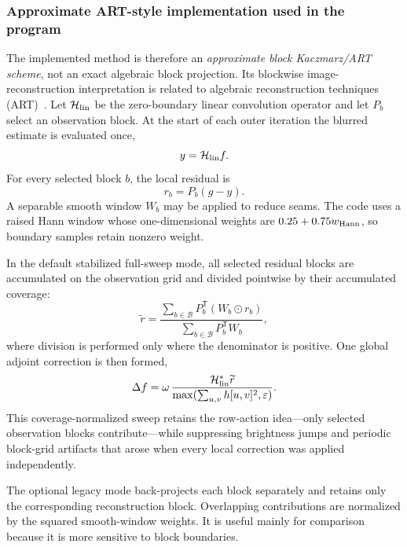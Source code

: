 \documentclass[10pt,a4paper]{article}
\begin{document}
\subsubsection*{Approximate ART-style implementation used in the program}
The implemented method is therefore an \emph{approximate block Kaczmarz/ART scheme}, not an exact algebraic block projection. Its blockwise image-reconstruction interpretation is related to algebraic reconstruction techniques (ART)~\cite{Gordon1970}. Let $\mathcal H_{\rm lin}$ be the zero-boundary linear convolution operator and let $P_b$ select an observation block. At the start of each outer iteration the blurred estimate is evaluated once,
\begin{equation}y=\mathcal H_{\rm lin}f.
\end{equation}
For every selected block $b$, the local residual is
\begin{equation}r_b=P_b(g-y).
\end{equation}
A separable smooth window $W_b$ may be applied to reduce seams. The code uses a raised Hann window whose one-dimensional weights are $0.25+0.75w_{\rm Hann}$, so boundary samples retain nonzero weight.

In the default stabilized full-sweep mode, all selected residual blocks are accumulated on the observation grid and divided pointwise by their accumulated coverage:
\begin{equation}
\widetilde r=
\frac{\sum_{b\in\mathcal B}P_b^{\mathsf T}(W_b\odot r_b)}
{\sum_{b\in\mathcal B}P_b^{\mathsf T}W_b},
\end{equation}
where division is performed only where the denominator is positive. One global adjoint correction is then formed,
\begin{equation}
\Delta f=\omega\,
\frac{\mathcal H_{\rm lin}^{*}\widetilde r}
{\max(\sum_{u,v}h[u,v]^2,\varepsilon)}.
\end{equation}
This coverage-normalized sweep retains the row-action idea---only selected observation blocks contribute---while suppressing brightness jumps and periodic block-grid artifacts that arose when every local correction was applied independently.

The optional legacy mode back-projects each block separately and retains only the corresponding reconstruction block. Overlapping contributions are normalized by the squared smooth-window weights. It is useful mainly for comparison because it is more sensitive to block boundaries.
\end{document}
